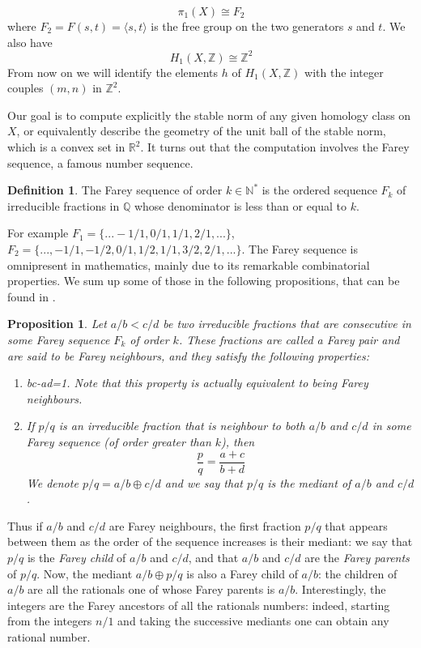\documentclass{article}
\newcommand{\NN}{\mathbb{N}}
\newcommand{\QQ}{\mathbb{Q}}
\newcommand{\RR}{\mathbb{R}}
\newcommand{\ZZ}{\mathbb{Z}}
\newtheorem{prop}[thm]{Proposition}
\theoremstyle{definition}
\newtheorem{definition}[thm]{Definition}
\begin{document}
	$$\pi_1(X) \cong F_2$$ where $F_2=F(s,t)=\langle s,t \rangle$ is the free group on the two generators $s$ and $t$. We also have
	$$H_1(X,\ZZ) \cong \ZZ^2$$ From now on we will identify the elements $h$ of $H_1(X,\ZZ)$ with the integer couples $(m,n)$ in $\ZZ^2$. \newline
 
 
 Our goal is to compute explicitly the stable norm of any given homology class on $X$, or equivalently describe the geometry of the unit ball of the stable norm, which is a convex set in $\RR^2$. It turns out that the computation involves the Farey sequence, a famous number sequence.


\begin{definition}
	The Farey sequence of order $k\in\NN^*$ is the ordered sequence $F_k$ of irreducible fractions in $\QQ$ whose denominator is less than or equal to $k$.
\end{definition}  

For example $F_1= \{... -1/1, 0/1,1/1,2/1,...  \}$, $F_2 =  \{ ..., -1/1, -1/2, 0/1, 1/2,1/1,3/2,2/1,...  \}$. The Farey sequence is omnipresent in mathematics, mainly due to its remarkable combinatorial properties. We sum up some of those in the following propositions, that can be found in \cite{Har}. 

\begin{prop}
	Let $a/b< c/d$ be two irreducible fractions that are consecutive in some Farey sequence $F_k$ of order $k$. These fractions are called a Farey pair and are said to be Farey neighbours, and they satisfy the following properties:
	\begin{enumerate}
		\item bc-ad=1. Note that this property is actually equivalent to being Farey neighbours.
		\item If $p/q$ is an irreducible fraction that is neighbour to both $a/b$ and $c/d$ in some Farey sequence (of order greater than $k$), then
		$$ \frac{p}{q} = \frac{a+c}{b+d}$$
		We denote $p/q = a/b \oplus c/d$ and we say that $p/q$ is the mediant of $a/b$ and $c/d$.
	\end{enumerate}
\end{prop}

Thus if $a/b$ and $c/d$ are Farey neighbours, the first fraction $p/q$ that appears between them as the order of the sequence increases is their mediant: we say that $p/q$ is the \emph{Farey child} of $a/b$ and $c/d$, and that $a/b$ and $c/d$ are the \emph{Farey parents} of $p/q$. Now, the mediant $a/b \oplus p/q$ is also a Farey child of $a/b$: the children of $a/b$ are all the rationals one of whose Farey parents is $a/b$. Interestingly, the integers are the Farey ancestors of all the rationals numbers: indeed, starting from the integers $n/1$ and taking the successive mediants one can obtain any rational number.
\end{document}

